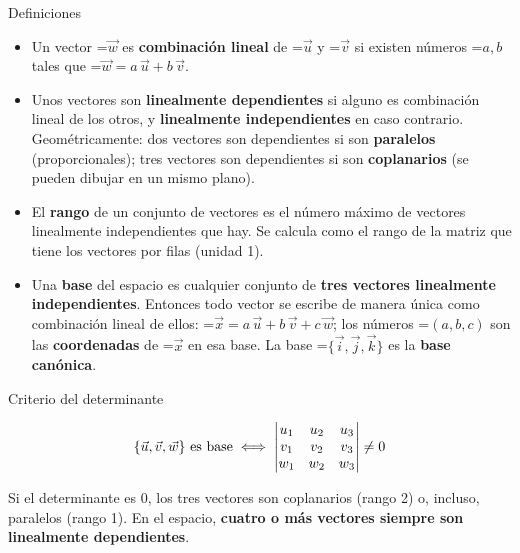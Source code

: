 \documentclass[11pt,a4paper]{article}
\newcommand{\fmm}[1]{\setbox0=\hbox{$#1$}\ifdim\wd0>\linewidth\fmdisp{#1}\else\mbox{\box0}\fi}
\newcommand{\fmdisp}[1]{\[\setbox2=\hbox{$\displaystyle #1$}\ifdim\wd2>\linewidth\resizebox{\linewidth}{!}{\box2}\else\box2\fi\]}
\begin{document}
\begin{fmdef}{Definiciones}
\begin{itemize}
\item Un vector \fmm{\vec w} es \textbf{combinación lineal} de \fmm{\vec u} y \fmm{\vec v} si existen números \fmm{a,b} tales que \fmm{\vec w=a\,\vec u+b\,\vec v}.
\item Unos vectores son \textbf{linealmente dependientes} si alguno es combinación lineal de los otros, y \textbf{linealmente independientes} en caso contrario. Geométricamente: dos vectores son dependientes si son \textbf{paralelos} (proporcionales); tres vectores son dependientes si son \textbf{coplanarios} (se pueden dibujar en un mismo plano).
\item El \textbf{rango} de un conjunto de vectores es el número máximo de vectores linealmente independientes que hay. Se calcula como el rango de la matriz que tiene los vectores por filas (unidad 1).
\item Una \textbf{base} del espacio es cualquier conjunto de \textbf{tres vectores linealmente independientes}. Entonces todo vector se escribe de manera única como combinación lineal de ellos: \fmm{\vec x=a\,\vec u+b\,\vec v+c\,\vec w}; los números \fmm{(a,b,c)} son las \textbf{coordenadas} de \fmm{\vec x} en esa base. La base \fmm{\{\vec i,\vec j,\vec k\}} es la \textbf{base canónica}.
\end{itemize}
\end{fmdef}

\begin{fmprop}{Criterio del determinante}

\fmdisp{\{\vec u,\vec v,\vec w\}\ \text{es base}\iff\begin{vmatrix}u_1&u_2&u_3\\v_1&v_2&v_3\\w_1&w_2&w_3\end{vmatrix}\neq0}

Si el determinante es 0, los tres vectores son coplanarios (rango 2) o, incluso, paralelos (rango 1). En el espacio, \textbf{cuatro o más vectores siempre son linealmente dependientes}.
\end{fmprop}
\end{document}
